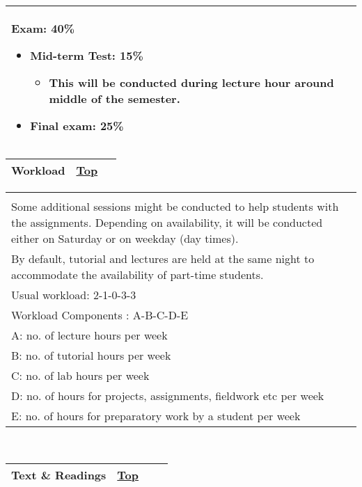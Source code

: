 \begin{longtable}[]{@{}l@{}}
\begin{minipage}[t]{0.97\columnwidth}
{\textbf{{Exam: 40\%}}}

\begin{itemize}
\tightlist
\item
  \textbf{{{Mid-term Test: 15\%}}}

  \begin{itemize}
  \tightlist
  \item
    This will be conducted during lecture hour around middle of the
    semester.
  \end{itemize}
\item
  \textbf{{{Final exam: 25\%}}}
\end{itemize}\strut
\end{minipage}\tabularnewline
\bottomrule
\end{longtable}

\begin{longtable}[]{@{}ll@{}}
\toprule
{\protect\hypertarget{Workload}{}{}Workload} &
{\protect\hyperlink{top}{Top}~~}\tabularnewline
\bottomrule
\end{longtable}

\begin{longtable}[]{@{}l@{}}
\toprule
\protect\hypertarget{ctl00_ctl00_ContentPlaceHolder1_ContentPlaceHolder1_LV_CourseInfo_ctrl6_lblCourseInfo}{}{\\
Some additional sessions might be conducted to help students with the
assignments. Depending on availability, it will be conducted either on
Saturday or on weekday (day times).~\\[2\baselineskip]By default,
tutorial and lectures are held at the same night to accommodate the
availability of part-time students.\\[2\baselineskip]Usual workload:
2-1-0-3-3\\[2\baselineskip]Workload Components : A-B-C-D-E\\
A: no. of lecture hours per week\\
B: no. of tutorial hours per week\\
C: no. of lab hours per week\\
D: no. of hours for projects, assignments, fieldwork etc per week\\
E: no. of hours for preparatory work by a student per
week}\tabularnewline
\bottomrule
\end{longtable}

~

\hypertarget{ctl00_ctl00_ContentPlaceHolder1_ContentPlaceHolder1_pnlReferences}{}
\begin{longtable}[]{@{}lll@{}}
\toprule
{\protect\hypertarget{References}{}{}Text \& Readings} &
{\protect\hyperlink{top}{Top}} & {~~}\tabularnewline
\bottomrule
\end{longtable}

